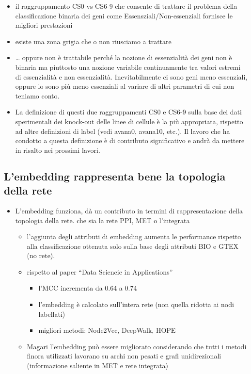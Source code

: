 \documentclass[
]{article}
\providecommand{\tightlist}{%
  \setlength{\itemsep}{0pt}\setlength{\parskip}{0pt}}
\begin{document}
\begin{itemize}
\tightlist
\item
  il raggruppamento CS0 vs CS6-9 che consente di trattare il problema
  della classificazione binaria dei geni come Essensziali/Non-essenziali
  fornisce le migliori prestazioni
\item
  esiste una zona grigia che o non riusciamo a trattare
\item
  \ldots{} oppure non è trattabile perché la nozione di essenzialità dei
  geni non è binaria ma piuttosto una nozione variabile continuamente
  tra valori estremi di essenzialità e non essenzialità. Inevitabilmente
  ci sono geni meno essenziali, oppure lo sono più meno essenziali al
  variare di altri parametri di cui non teniamo conto.
\item
  La definizione di questi due raggruppamenti CS0 e CS6-9 sulla base dei
  dati sperimentali dei knock-out delle linee di cellule è la più
  appropriata, rispetto ad altre definizioni di label (vedi avana0,
  avana10, etc.). Il lavoro che ha condotto a questa definizione è di
  contributo significativo e andrà da mettere in risalto nei prossimi
  lavori.
\end{itemize}

\hypertarget{lembedding-rappresenta-bene-la-topologia-della-rete}{%
\subsection{L'embedding rappresenta bene la topologia della
rete}\label{lembedding-rappresenta-bene-la-topologia-della-rete}}

\begin{itemize}
\tightlist
\item
  L'embedding funziona, dà un contributo in termini di rappresentazione
  della topologia della rete. che sia la rete PPI, MET o l'integrata

  \begin{itemize}
  \tightlist
  \item
    l'aggiunta degli attributi di embedding aumenta le performance
    rispetto alla classificazione ottenuta solo sulla base degli
    attributi BIO e GTEX (no rete).
  \item
    rispetto al paper ``Data Sciencie in Applications''

    \begin{itemize}
    \tightlist
    \item
      l'MCC incrementa da 0.64 a 0.74
    \item
      l'embedding è calcolato sull'intera rete (non quella ridotta ai
      nodi labellati)
    \item
      migliori metodi: Node2Vec, DeepWalk, HOPE
    \end{itemize}
  \item
    Magari l'embedding può essere migliorato considerando che tutti i
    metodi finora utilizzati lavorano su archi non pesati e grafi
    unidirezionali (informazione saliente in MET e rete integrata)
  \end{itemize}
\end{itemize}
\end{document}
